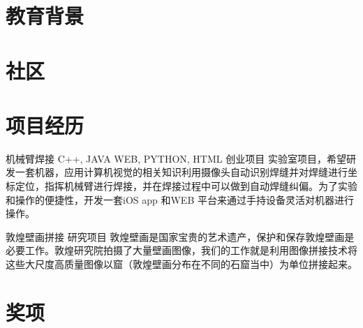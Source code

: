 ﻿\documentclass[11pt,a4paper]{moderncv}
\title{}               %
\begin{document}
\maketitle

\section{教育背景}
 {}{} %


\section{社区}

\section{项目经历}
\renewcommand{\baselinestretch}{1.2}

{机械臂焊接}
{C++, JAVA WEB, PYTHON, HTML}
{创业项目}{}
{实验室项目，希望研发一套机器，应用计算机视觉的相关知识利用摄像头自动识别焊缝并对焊缝进行坐标定位，指挥机械臂进行焊接，并在焊接过程中可以做到自动焊缝纠偏。为了实验和操作的便捷性，开发一套iOS app 和WEB 平台来通过手持设备灵活对机器进行操作。}

\vspace*{0.2\baselineskip}
{敦煌壁画拼接}{}
{研究项目}{}
{敦煌壁画是国家宝贵的艺术遗产，保护和保存敦煌壁画是必要工作。敦煌研究院拍摄了大量壁画图像，我们的工作就是利用图像拼接技术将这些大尺度高质量图像以窟（敦煌壁画分布在不同的石窟当中）为单位拼接起来。}

\section{奖项}
\end{document}
